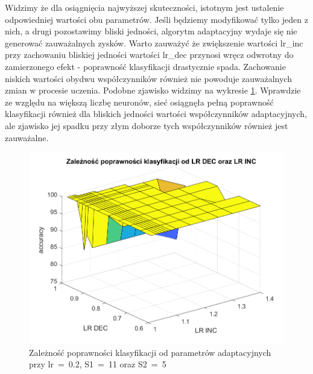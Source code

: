 \documentclass[12pt,twoside]{article}
\begin{document}
Widzimy że dla osiągnięcia najwyższej skuteczności, istotnym jest ustalenie odpowiedniej wartości obu parametrów.
Jeśli będziemy modyfikować tylko jeden z nich, a drugi pozostawimy bliski jedności, algorytm adaptacyjny wydaje się nie generować zauważalnych zysków.
Warto zauważyć że zwiększenie wartości lr\_inc przy zachowaniu bliskiej jedności wartości lr\_dec przynosi wręcz odwrotny do zamierzonego efekt - poprawność klasyfikacji drastycznie spada.
Zachowanie niskich wartości obydwu współczynników również nie powoduje zauważalnych zmian w procesie uczenia.
Podobne zjawisko widzimy na wykresie \ref{Fig:IncDec6}.
Wprawdzie ze względu na większą liczbę neuronów, sieć osiągnęła pełną poprawność klasyfikacji również dla bliskich jedności wartości współczynników adaptacyjnych, ale zjawisko jej spadku przy złym doborze tych współczynników również jest zauważalne.

\begin{figure}[ht]
	\centering
	\includegraphics[width=16cm]{figures/IncDec_6.png}
	\caption{Zależność poprawności klasyfikacji od parametrów adaptacyjnych przy lr~=~0.2, S1~=~11 oraz S2~=~5}
	\label{Fig:IncDec6}
\end{figure}
\end{document}
